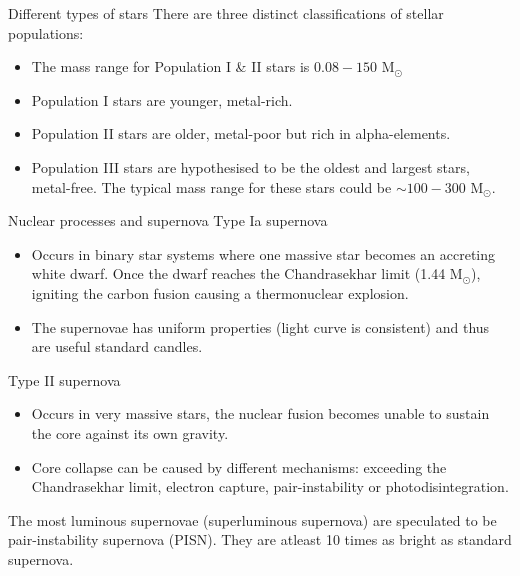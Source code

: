 \documentclass[aspectratio=169]{beamer}
\begin{document}
\begin{frame}{Different types of stars}
	There are three distinct classifications of stellar populations:
	\begin{itemize}
		\item The mass range for Population I \& II stars is $0.08-150$ M$_\odot$ 
		\item Population I stars are younger, metal-rich.
		\item Population II stars are older, metal-poor but rich in alpha-elements.
		\item Population III stars are hypothesised to be the oldest and largest stars, metal-free. The typical mass range for these stars could be $\sim 100 - 300$ M$_\odot$.
	\end{itemize}
\end{frame}

\begin{frame}{Nuclear processes and supernova}
	Type Ia supernova
	\begin{itemize}
		\item Occurs in binary star systems where one massive star becomes an accreting white dwarf. Once the dwarf reaches the Chandrasekhar limit (1.44 M$_\odot$), igniting the carbon fusion causing a thermonuclear explosion.
		\item The supernovae has uniform properties (light curve is consistent) and thus are useful standard candles.
	\end{itemize}
	Type II supernova
	\begin{itemize}
		\item Occurs in very massive stars, the nuclear fusion becomes unable to sustain the core against its own gravity.
		\item Core collapse can be caused by different mechanisms: exceeding the Chandrasekhar limit, electron capture, pair-instability or photodisintegration.
	\end{itemize}
	The most luminous supernovae (superluminous supernova) are speculated to be pair-instability supernova (PISN). They are atleast 10 times as bright as standard supernova.
\end{frame}
\end{document}
